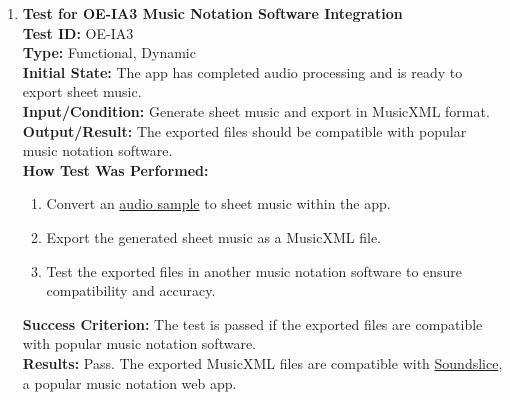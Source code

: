 \documentclass[12pt, titlepage]{article}
\begin{document}
\begin{enumerate}
    \item \textbf{Test for OE-IA3 Music Notation Software Integration} \\
      \newline
      \textbf{Test ID:} OE-IA3 \\
      \textbf{Type:} Functional, Dynamic \\
      \textbf{Initial State:} The app has completed audio processing and is ready to export sheet music. \\
      \textbf{Input/Condition:} Generate sheet music and export in MusicXML format. \\
      \textbf{Output/Result:} The exported files should be compatible with popular music notation software. \\
      \textbf{How Test Was Performed:}
      \begin{enumerate}
          \item Convert an \href{https://github.com/emilyperica/ScoreGen/tree/main/test/TestingDatasets/piano-samples/sample-songs}{audio sample} to sheet music within the app.
          \item Export the generated sheet music as a MusicXML file.
          \item Test the exported files in another music notation software to ensure compatibility and accuracy.
      \end{enumerate}
      \textbf{Success Criterion:} The test is passed if the exported files are compatible with popular music notation software.\\
      \textbf{Results:} Pass. The exported MusicXML files are compatible with \href{https://www.soundslice.com/}{Soundslice}, a popular music notation web app.\\


\end{enumerate}
\end{document}
